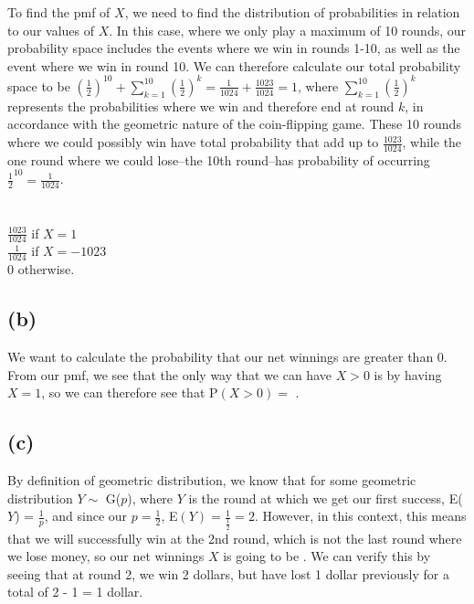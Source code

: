 \documentclass{article}
\begin{document}
{To find the pmf of $X$, we need to find the distribution of probabilities in relation to our values of $X$. In this case, where we only play a maximum of 10 rounds, our probability space includes the events where we win in rounds 1-10, as well as the event where we win in round 10. We can therefore calculate our total probability space to be $(\frac{1}{2})^{10} + \sum_{k=1}^{10} (\frac{1}{2})^k = \frac{1}{1024} + \frac{1023}{1024} = 1$, where $\sum_{k=1}^{10} (\frac{1}{2})^k$ represents the probabilities where we win and therefore end at round $k$, in accordance with the geometric nature of the coin-flipping game. These 10 rounds where we could possibly win have total probability that add up to $\frac{1023}{1024}$, while the one round where we could lose--the 10th round--has probability of occurring $\frac{1}{2}^{10} = \frac{1}{1024}$. \\ \\
 \\
$\frac{1023}{1024}$ if $X = 1$\\ 
$\frac{1}{1024}$ if $X = -1023$\\ 
0 otherwise.


\subsection*{(b)}
We want to calculate the probability that our net winnings are greater than 0. From our pmf, we see that the only way that we can have $X > 0$ is by having $X = 1$, so we can therefore see that P$(X > 0) =$ .

\subsection*{(c)}
By definition of geometric distribution, we know that for some geometric distribution $Y \sim $ G($p$), where $Y$ is the round at which we get our first success, E($Y$) = $\frac{1}{p}$, and since our $p = \frac{1}{2}$, E$(Y) = \frac{1}{\frac{1}{2}} = 2$. However, in this context, this means that we will successfully win at the 2nd round, which is not the last round where we lose money, so our net winnings $X$ is going to be . We can verify this by seeing that at round 2, we win 2 dollars, but have lost 1 dollar previously for a total of 2 - 1 = 1 dollar.

}
\end{document}
